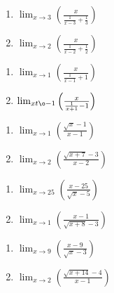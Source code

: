 \begin{multicols}{2}
\begin{enumerate}	\setcounter{enumi}{\value{Review}}
	\item $\lim_{x \to 3} \left(\frac{x}{\frac{1}{x-3}+\frac{1}{3}}\right)$
	\item $\lim_{x \to 2} \left(\frac{x}{\frac{1}{x-2}+\frac{1}{2}}\right)$
\end{enumerate}	\setcounter{Review}{\value{enumi}}
\end{multicols}
\begin{multicols}{2}
\begin{enumerate}	\setcounter{enumi}{\value{Review}}
	\item $\lim_{x \to 1} \left(\frac{x}{\frac{1}{x-1}+1}\right)$
	\item $\lim_{x t\o -1} \left(\frac{x}{\frac{1}{x+1}-1}\right)$
\end{enumerate}	\setcounter{Review}{\value{enumi}}
\end{multicols}
\begin{multicols}{2}
\begin{enumerate}	\setcounter{enumi}{\value{Review}}	
	\item $\lim_{x \to 1} \left(\frac{\sqrt{x}-1}{x-1}\right)$
	\item $\lim_{x \to 2} \left(\frac{\sqrt{x+7}-3}{x-2}\right)$
\end{enumerate}	\setcounter{Review}{\value{enumi}}
\end{multicols}
\begin{multicols}{2}
\begin{enumerate}	\setcounter{enumi}{\value{Review}}
	\item $\lim_{x \to 25} \left(\frac{x-25}{\sqrt{x}-5}\right)$
	\item $\lim_{x \to 1} \left(\frac{x-1}{\sqrt{x+8}-3}\right)$
\end{enumerate}	\setcounter{Review}{\value{enumi}}
\end{multicols}
\begin{multicols}{2}
\begin{enumerate}	\setcounter{enumi}{\value{Review}}
	\item $\lim_{x \to 9} \left(\frac{x-9}{\sqrt{x}-3}\right)$
	\item $\lim_{x \to 2} \left(\frac{\sqrt{x+14}-4}{x-1}\right)$
\end{enumerate}
\end{multicols}

\newpage

